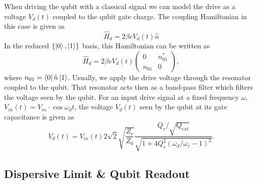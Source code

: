 When driving the qubit with a classical signal we can model the drive as a voltage $V_d(t)$ coupled to the qubit gate charge. The coupling Hamiltonian in this case is given as
%
\begin{equation}
\hat{H}_d = 2\beta e V_d(t) \hat{n}
\end{equation}
%
In the reduced $\{\left| 0 \right>,\left| 1 \right>\}$ basis, this Hamiltonian can be written as
%
\begin{equation}
\hat{H}_d = 2\beta e V_d(t)\left(\begin{array}{cc} 0 & n_{01}^* \\ n_{01} & 0 \end{array}\right), \label{eq:drive_hamiltonian}
\end{equation}
%
where $n_{01} = \left< 0 \right|\hat{n}\left| 1 \right>$. Usually, we apply the drive voltage through the resonator coupled to the qubit. That resonator acts then as a band-pass filter which filters the voltage seen by the qubit. For an input drive signal at a fixed frequency $\omega$, $V_{in}(t)=V_{in}\cdot\cos{\omega_d t}$, the voltage $V_d(t)$ seen by the qubit at its gate capacitance is given as
%
\begin{equation}
V_{d}(t) = V_{in}(t) 2 \sqrt{2}\sqrt{\frac{Z_{r}}{Z_0}}\frac{Q_{r}/\sqrt{Q_{ext}}}{\sqrt{1+4Q_{r}^2(\omega_d/\omega_r-1)^2}}. \label{eq:qubit_drive_voltage}
\end{equation}
%

\subsection{Dispersive Limit \& Qubit Readout}

